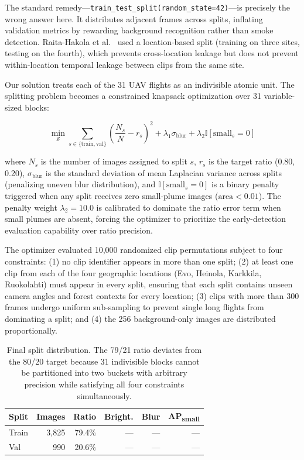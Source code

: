 \documentclass[10pt,twocolumn]{article}
\begin{document}
The standard remedy---\texttt{train\_test\_split(random\_state=42)}---is precisely the wrong answer here. It distributes adjacent frames across splits, inflating validation metrics by rewarding background recognition rather than smoke detection. Raita-Hakola et al.~\cite{raita2023combining} used a location-based split (training on three sites, testing on the fourth), which prevents cross-location leakage but does not prevent within-location temporal leakage between clips from the same site.

Our solution treats each of the 31 UAV flights as an indivisible atomic unit. The splitting problem becomes a constrained knapsack optimization over 31 variable-sized blocks:

\begin{equation}
\min_{\mathcal{S}} \sum_{s \in \{\text{train},\text{val}\}} \left(\frac{N_s}{N} - r_s\right)^2 + \lambda_1 \sigma_{\text{blur}} + \lambda_2 \mathbb{I}[\text{small}_s = 0]
\label{eq:split_opt}
\end{equation}

where \(N_s\) is the number of images assigned to split \(s\), \(r_s\) is the target ratio (0.80, 0.20), \(\sigma_{\text{blur}}\) is the standard deviation of mean Laplacian variance across splits (penalizing uneven blur distribution), and \(\mathbb{I}[\text{small}_s = 0]\) is a binary penalty triggered when any split receives zero small-plume images (\(\text{area} < 0.01\)). The penalty weight \(\lambda_2 = 10.0\) is calibrated to dominate the ratio error term when small plumes are absent, forcing the optimizer to prioritize the early-detection evaluation capability over ratio precision.

The optimizer evaluated 10,000 randomized clip permutations subject to four constraints: (1) no clip identifier appears in more than one split; (2) at least one clip from each of the four geographic locations (Evo, Heinola, Karkkila, Ruokolahti) must appear in every split, ensuring that each split contains unseen camera angles and forest contexts for every location; (3) clips with more than 300 frames undergo uniform sub-sampling to prevent single long flights from dominating a split; and (4) the 256 background-only images are distributed proportionally.

\begin{table}[H]
\centering
\caption{Final split distribution. The 79/21 ratio deviates from the 80/20 target because 31 indivisible blocks cannot be partitioned into two buckets with arbitrary precision while satisfying all four constraints simultaneously.}
\label{tab:split}
\begin{tabular}{@{}lrrrrr@{}}
\toprule
\textbf{Split} & \textbf{Images} & \textbf{Ratio} & \textbf{Bright.} & \textbf{Blur} & \textbf{AP\textsubscript{small}} \\
\midrule
Train & 3,825 & 79.4\% & --- & --- & --- \\
Val   & 990   & 20.6\% & --- & --- & --- \\
\bottomrule
\end{tabular}
\end{table}
\end{document}

